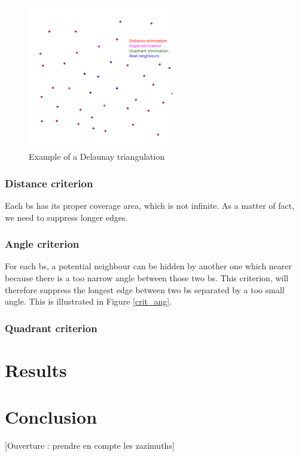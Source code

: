 \documentclass[lettersize,journal,english]{IEEEtran}
\begin{document}
\begin{figure}[!t]
    \centering
    \includegraphics[width=2.5in]{images/illus_crit/neighs.png}
    \caption{Example of a Delaunay triangulation}
    \label{crit_nei}
\end{figure}

\subsubsection{Distance criterion}
Each \acrshort{bs} has its proper coverage area, which is not infinite. As a matter of fact, we need to suppress longer edges.

\subsubsection{Angle criterion}
For each \acrshort{bs}, a potential neighbour can be \og hidden\fg{} by another one which nearer because there is a too narrow angle between those two \acrshort{bs}.
This criterion, will therefore suppress the longest edge between two \acrshort{bs} separated by a too small angle. This is illustrated in Figure \ref{crit_ang}.

\subsubsection{Quadrant criterion}

\section{Results}

\section{Conclusion}

[Ouverture : prendre en compte les zazimuths]

\printglossary[type=\acronymtype]
\printglossary



\end{document}
